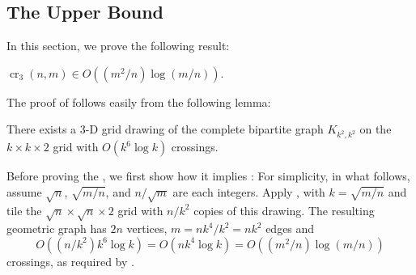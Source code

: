 \documentclass{patmorin}
\DeclareMathOperator{\crs}{cr}
\begin{document}
\subsection{The Upper Bound}

In this section, we prove the following result:

\begin{thm}
  $\crs_3(n,m) \in O((m^2/n)\log (m/n))$.
\end{thm}

The proof of  follows easily from the following
lemma:
\begin{lem}
  There exists a 3-D grid drawing of the complete bipartite graph
  $K_{k^2,k^2}$ on the $k\times k\times 2$ grid with $O(k^6\log k)$
  crossings.
\end{lem}

Before proving the , we first show how it implies
: For simplicity, in what follows, assume
$\sqrt{n}$, $\sqrt{m/n}$, and $n/\sqrt{m}$ are each integers.
Apply , with $k=\sqrt{m/n}$ and tile the
$\sqrt{n}\times\sqrt{n}\times 2$ grid with $n/k^2$ copies of
this drawing. The resulting geometric graph has $2n$ vertices,
$m=nk^4/k^2=nk^2$ edges and
\[ 
   O((n/k^2)k^6\log k) = O(nk^4\log k) = O((m^2/n)\log(m/n))
\] 
crossings, as required by .
\end{document}
